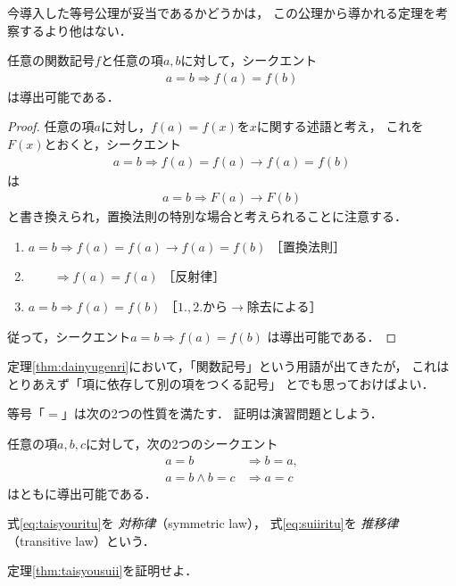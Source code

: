    今導入した等号公理が妥当であるかどうかは，
   この公理から導かれる定理を考察するより他はない．
   \begin{thm}[代入原理] \label{thm:dainyugenri}
     任意の関数記号$f$と任意の項$a,  b$に対して，シークエント
     \begin{align}
       a=b \Longrightarrow  f(a)=f(b)
       \label{eq:dainyu}
     \end{align}
     は導出可能である．
   \end{thm}
   \begin{proof}
     任意の項$a$に対し，$f(a)=f(x)$を$x$に関する述語と考え，
     これを$F(x)$とおくと，シークエント
     \begin{align*}
       a = b \Longrightarrow f(a)=f(a) \to f(a)=f(b)
     \end{align*}
     は
     \begin{align*}
       a=b \Longrightarrow F(a) \to F(b)
     \end{align*}
     と書き換えられ，置換法則の特別な場合と考えられることに注意する．
     \begin{enumerate}[1. ]
       \item $a=b \Longrightarrow f(a)=f(a) \to f(a) = f(b)$ \quad ［置換法則］
       \item $\qquad \Longrightarrow f(a)=f(a)$ \quad ［反射律］
       \item $a=b \Longrightarrow f(a) = f(b) $ \quad ［$1., 2.$から$\to$除去による］
     \end{enumerate}
     従って，シークエント$a=b \Longrightarrow f(a) = f(b)$
     は導出可能である．
   \end{proof}
   定理\ref{thm:dainyugenri}において，「関数記号」という用語が出てきたが，
   これはとりあえず「項に依存して別の項をつくる記号」
   とでも思っておけばよい．

   等号「$=$」は次の2つの性質を満たす．
   証明は演習問題としよう．
   \begin{thm} \label{thm:taisyousuii}
     任意の項$a,  b,  c$に対して，次の2つのシークエント
     \begin{align}
       a = b & \Longrightarrow b = a ,
       \label{eq:taisyouritu} \\
       a =b \land b=c & \Longrightarrow a =c
       \label{eq:suiiritu}
     \end{align}
     はともに導出可能である．
     \end{thm}
     式\eqref{eq:taisyouritu}を
     \emph{対称律}（symmetric law），
     式\eqref{eq:suiiritu}を
     \emph{推移律}（transitive law）という．
     \begin{que} \label{que:taisyousuii}
       定理\ref{thm:taisyousuii}を証明せよ．
     \end{que}

